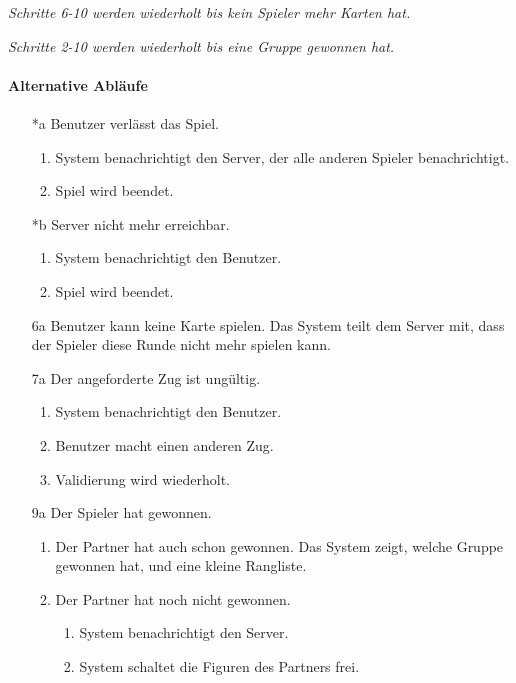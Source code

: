 \documentclass[12pt,halfparskip]{scrartcl}
\begin{document}
\emph{Schritte 6-10 werden wiederholt bis kein Spieler mehr Karten hat.}

\emph{Schritte 2-10 werden wiederholt bis eine Gruppe gewonnen hat.}

\newpage
\paragraph{Alternative Abläufe}
\begin{enumerate}
	\item[*a] Benutzer verlässt das Spiel.
	\begin{enumerate}
		\item System benachrichtigt den Server, der alle anderen Spieler benachrichtigt.
		\item Spiel wird beendet.
	\end{enumerate}
	
	\item[*b] Server nicht mehr erreichbar.
	\begin{enumerate}
		\item System benachrichtigt den Benutzer.
		\item Spiel wird beendet.
	\end{enumerate}
	
	\item[6a] Benutzer kann keine Karte spielen.\newline
	Das System teilt dem Server mit, dass der Spieler diese Runde nicht mehr spielen kann.
	
	\item[7a] Der angeforderte Zug ist ungültig.
	\begin{enumerate}
		\item System benachrichtigt den Benutzer.
		\item Benutzer macht einen anderen Zug.
		\item Validierung wird wiederholt.
	\end{enumerate}
	
	\item[9a] Der Spieler hat gewonnen.
	\begin{enumerate}
		\item Der Partner hat auch schon gewonnen.\newline
		Das System zeigt, welche Gruppe gewonnen hat, und eine kleine Rangliste.
		\item Der Partner hat noch nicht gewonnen.
		\begin{enumerate}
			\item System benachrichtigt den Server.
			\item System schaltet die Figuren des Partners frei.
		\end{enumerate}
	\end{enumerate}
\end{enumerate}
\end{document}
